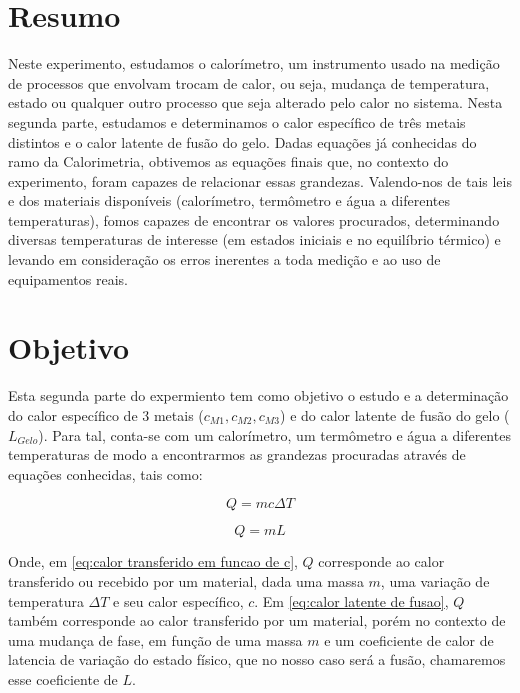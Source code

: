\documentclass[a4paper]{article}
\begin{document}
	\section{Resumo}
		Neste experimento, estudamos o calorímetro, um instrumento usado na
		medição de processos que envolvam trocam de calor, ou seja, mudança
		de temperatura, estado ou qualquer outro processo que seja alterado
		pelo calor no sistema. Nesta segunda parte, estudamos e determinamos
		o calor específico de três metais distintos e o calor latente de fusão
		do gelo. Dadas equações já conhecidas do ramo da Calorimetria, obtivemos
		as equações finais que, no contexto do experimento, foram capazes
		de relacionar essas grandezas. Valendo-nos de tais leis e dos materiais
		disponíveis (calorímetro, termômetro e água a diferentes temperaturas),
		fomos capazes de encontrar os valores procurados, determinando diversas
		temperaturas de interesse (em estados iniciais e no equilíbrio térmico)
		e levando em consideração os erros inerentes a toda medição e ao uso
		de equipamentos reais.


	\section{Objetivo}
		Esta segunda parte do expermiento tem como objetivo o estudo e a determinação
		do calor específico de 3 metais ($c_{M1},c_{M2},c_{M3}$) e do calor
		latente de fusão do gelo ($L_{Gelo}$). Para tal, conta-se com um
		calorímetro, um termômetro e água a diferentes temperaturas de modo
		a encontrarmos as grandezas procuradas através de equações conhecidas,
		tais como:

		\begin{equation}
			Q=mc\Delta T
			\label{eq:calor transferido em funcao de c}
		\end{equation}


		\begin{equation}
			Q=mL
			\label{eq:calor latente de fusao}
		\end{equation}


		Onde, em \eqref{eq:calor transferido em funcao de c}, $Q$ corresponde
		ao calor transferido ou recebido por um material, dada uma massa $m$,
		uma variação de temperatura $\Delta T$ e seu calor específico, $c$.
		Em \eqref{eq:calor latente de fusao}, $Q$ também corresponde ao
		calor transferido por um material, porém no contexto de uma mudança
		de fase, em função de uma massa $m$ e um coeficiente de calor de
		latencia de variação do estado físico, que no nosso caso será a fusão,
		chamaremos esse coeficiente de $L$.
\end{document}
